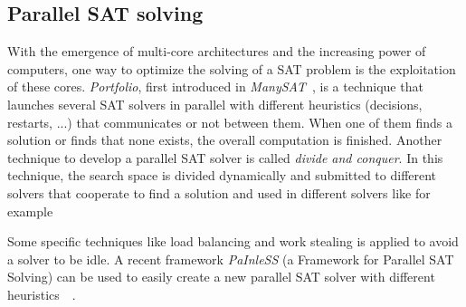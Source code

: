 \subsection{Parallel SAT solving}
With the emergence of multi-core architectures and the increasing power of computers, one way to optimize the solving
of a SAT problem is the exploitation of these cores. %
\emph{Portfolio}, first introduced in \emph{ManySAT}~\cite{hamadi2008manysat}, is a technique that launches several SAT solvers in parallel with different heuristics (decisions, restarts, ...) that 
communicates or not between them. When one of them finds a solution or finds that none exists, the overall computation is finished.
Another technique to develop a parallel SAT solver is called \emph{divide and conquer}. In this technique,
the search space is divided  dynamically and submitted to different solvers that cooperate to find a solution and used in
different solvers like for example~\cite{chu2008pminisat, lewis2007multithreaded}

 Some specific techniques like load balancing and work stealing is applied to avoid a solver to be idle.
A recent framework \emph{PaInleSS} (a Framework for Parallel SAT Solving) can be used to easily create a new parallel 
SAT solver with different heuristics~\cite{le2017painless}~\cite{le2019modular}. 

%
